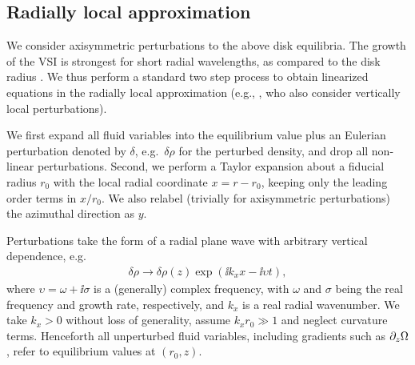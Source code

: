 \subsection{Radially local approximation}\label{sec:radlocal}
We consider axisymmetric perturbations to the above disk equilibria.    
The growth of the VSI is strongest for short radial wavelengths, as compared
 to the disk radius .  We thus perform a
 standard two step process to obtain linearized equations in the radially local 
 approximation (e.g., \citealp{goldreich67}, who also consider vertically local perturbations).  
 
 We first expand all fluid variables 
 into the equilibrium value plus an Eulerian perturbation denoted by $\delta$, e.g.\ 
 $\delta \rho$ for the perturbed density, and drop all non-linear perturbations.  Second, we perform
 a Taylor expansion about a fiducial radius $r_0$ with the local radial coordinate
 $x = r - r_0$, keeping only the leading order terms in $x/r_0$.  We also relabel 
 (trivially for axisymmetric perturbations) the azimuthal direction as $y$.  
 
 Perturbations take the form of a radial plane wave with arbitrary vertical dependence, 
 e.g.\
 \begin{align}
  \delta\rho \rightarrow \delta\rho(z)\exp{\left(\ii k_x x - \ii\upsilon
      t\right)},    
\end{align}
where $\upsilon = \omega + \ii \sigma$ is a (generally) complex frequency, 
with $\omega$ and $\sigma$ being
the real frequency and growth rate, respectively, and $k_x$ is a real 
radial wavenumber.  We take $k_x>0$ without loss of generality, 
assume $k_xr_0 \gg 1$ and neglect curvature terms. 
Henceforth all unperturbed fluid variables, including 
gradients such as $\partial_z \Omega$, refer to  equilibrium values at $(r_0, z)$.

